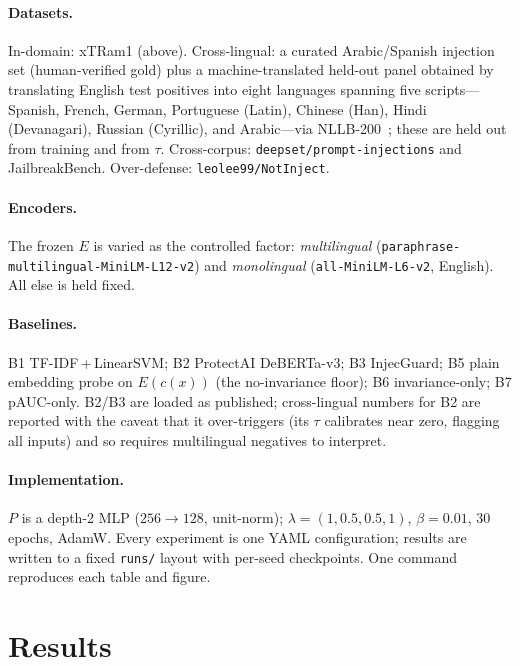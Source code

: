 \documentclass[pdflatex,sn-mathphys-num]{sn-jnl}
\newcommand{\canon}{c}
\theoremstyle{plain}
\begin{document}
\paragraph{Datasets.} In-domain: xTRam1 (above). Cross-lingual: a curated
Arabic/Spanish injection set (human-verified gold) plus a machine-translated
held-out panel obtained by translating English test positives into eight languages
spanning five scripts---Spanish, French, German, Portuguese (Latin), Chinese (Han),
Hindi (Devanagari), Russian (Cyrillic), and Arabic---via
NLLB-200~\cite{nllb2022}; these are held out from training and from $\tau$.
Cross-corpus: \texttt{deepset/prompt-injections} and JailbreakBench. Over-defense:
\texttt{leolee99/NotInject}.

\paragraph{Encoders.} The frozen $E$ is varied as the controlled factor:
\emph{multilingual} (\texttt{paraphrase-multilingual-MiniLM-L12-v2}) and
\emph{monolingual} (\texttt{all-MiniLM-L6-v2}, English). All else is held fixed.

\paragraph{Baselines.} B1 TF-IDF\,+\,LinearSVM; B2 ProtectAI DeBERTa-v3;
B3 InjecGuard; B5 plain embedding probe on $E(\canon(x))$ (the no-invariance floor);
B6 invariance-only; B7 pAUC-only. B2/B3 are loaded as published; cross-lingual
numbers for B2 are reported with the caveat that it over-triggers (its $\tau$
calibrates near zero, flagging all inputs) and so requires multilingual negatives
to interpret.

\paragraph{Implementation.} $P$ is a depth-2 MLP ($256\!\to\!128$, unit-norm);
$\lambda=(1,0.5,0.5,1)$, $\beta=0.01$, $30$ epochs, AdamW. Every experiment is one
YAML configuration; results are written to a fixed \texttt{runs/} layout with
per-seed checkpoints. One command reproduces each table and figure.

\section{Results}\label{sec:results}
\end{document}
